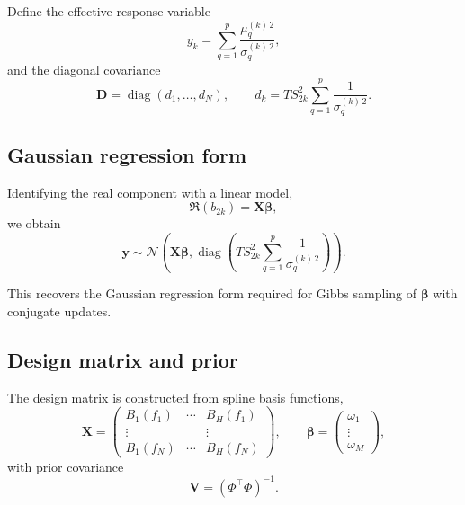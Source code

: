 Define the effective response variable
\begin{equation}
y_k
=
\sum_{q=1}^{p}
\frac{\mu_q^{(k)\,2}}{\sigma_q^{(k)\,2}},
\end{equation}
and the diagonal covariance
\begin{equation}
\mathbf{D}
=
\operatorname{diag}(d_1,\ldots,d_N),
\qquad
d_k
=
T S_{2k}^2
\sum_{q=1}^{p}
\frac{1}{\sigma_q^{(k)\,2}} .
\end{equation}

\subsection{Gaussian regression form}

Identifying the real component with a linear model,
\begin{equation}
\Re(b_{2k})
=
\mathbf{X}\boldsymbol{\beta},
\end{equation}
we obtain
\begin{equation}
\mathbf{y}
\sim
\mathcal{N}
\!\left(
\mathbf{X}\boldsymbol{\beta},
\operatorname{diag}
\left(
T S_{2k}^2
\sum_{q=1}^{p}
\frac{1}{\sigma_q^{(k)\,2}}
\right)
\right).
\end{equation}

This recovers the Gaussian regression form required for Gibbs sampling
of $\boldsymbol{\beta}$ with conjugate updates.

\subsection{Design matrix and prior}

The design matrix is constructed from spline basis functions,
\begin{equation}
\mathbf{X}
=
\begin{pmatrix}
B_1(f_1) & \cdots & B_H(f_1) \\
\vdots  &        & \vdots  \\
B_1(f_N) & \cdots & B_H(f_N)
\end{pmatrix},
\qquad
\boldsymbol{\beta}
=
\begin{pmatrix}
\omega_1 \\
\vdots \\
\omega_M
\end{pmatrix},
\end{equation}
with prior covariance
\begin{equation}
\mathbf{V} = (\Phi^\top \Phi)^{-1}.
\end{equation}



